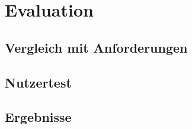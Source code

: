 

\chapter{Evaluation}
\label{evaluation}

\section{Vergleich mit Anforderungen}

\section{Nutzertest}

\section{Ergebnisse}
